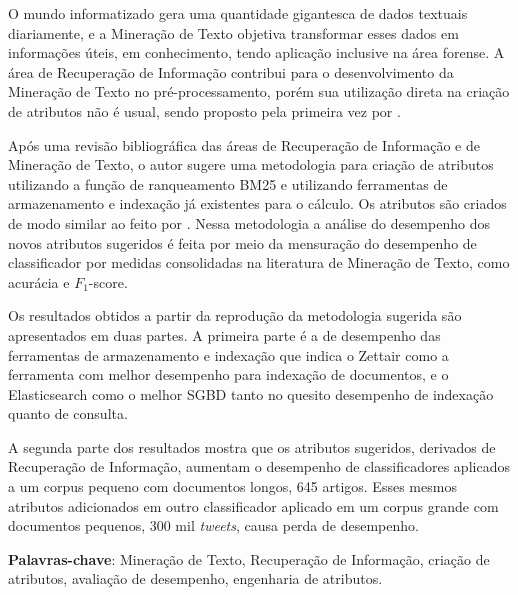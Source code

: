 \setlength{\absparsep}{18pt} %
\begin{resumo}
    
    O mundo informatizado gera uma quantidade gigantesca de dados textuais diariamente, e a Mineração de Texto objetiva transformar esses dados em informações úteis, em conhecimento, tendo aplicação inclusive na área forense.
    A área de Recuperação de Informação contribui para o desenvolvimento da Mineração de Texto no pré-processamento, porém sua utilização direta na criação de atributos não é usual, sendo proposto pela primeira vez por .
    
    Após uma revisão bibliográfica das áreas de Recuperação de Informação e de Mineração de Texto, o autor sugere uma metodologia para criação de atributos utilizando a função de ranqueamento BM25 e utilizando ferramentas de armazenamento e indexação já existentes para o cálculo.
    Os atributos são criados de modo similar ao feito por .
    Nessa metodologia a análise do desempenho dos novos atributos sugeridos é feita por meio da mensuração do desempenho de classificador por medidas consolidadas na literatura de Mineração de Texto, como acurácia e $F_1$-score.

    Os resultados obtidos a partir da reprodução da metodologia sugerida são apresentados em duas partes. 
    A primeira parte é a de desempenho das ferramentas de armazenamento e indexação que indica o Zettair como a ferramenta com melhor desempenho para indexação de documentos, e o Elasticsearch como o melhor SGBD tanto no quesito desempenho de indexação quanto de consulta.

    A segunda parte dos resultados mostra que os atributos sugeridos, derivados de Recuperação de Informação, aumentam o desempenho de classificadores aplicados a um corpus pequeno com documentos longos, 645 artigos.
    Esses mesmos atributos adicionados em outro classificador aplicado em um corpus grande com documentos pequenos, 300 mil \textit{tweets}, causa perda de desempenho.
    
    \vspace{\onelineskip}
    
	\noindent
    \textbf{Palavras-chave}: Mineração de Texto, Recuperação de Informação, criação de atributos, avaliação de desempenho, engenharia de atributos.
    
\end{resumo}